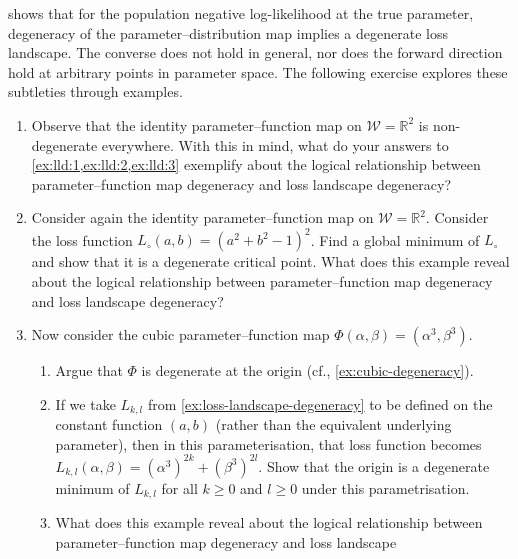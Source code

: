\documentclass[11pt]{article}
\newcommand{\R}{\mathbb{R}}
\newcommand{\W}{\mathcal{W}}
\begin{document}
 shows that for the population negative log-likelihood at
the true parameter, degeneracy of the parameter--distribution map implies a
degenerate loss landscape. The converse does not hold in general, nor does the
forward direction hold at arbitrary points in parameter space. The following
exercise explores these subtleties through examples.

\begin{exercise}
\label{ex:loss-degeneracy-examples}
\begin{enumerate}
    \item
        Observe that the identity parameter--function map on $\W = \R^2$
        is non-degenerate everywhere. With this in mind, what do your answers
        to \cref{ex:lld:1,ex:lld:2,ex:lld:3} exemplify about the logical
        relationship between parameter--function map degeneracy and loss
        landscape degeneracy?
    \item
        Consider again the identity parameter--function map on $\W = \R^2$.
        Consider the loss function $L_\circ(a,b) = (a^2 + b^2 - 1)^2$.
        Find a global minimum of $L_\circ$ and show that it is a degenerate
        critical point.
        What does this example reveal about the logical relationship between
        parameter--function map degeneracy and loss landscape degeneracy?
    \item
        Now consider the cubic parameter--function map
            $\Phi(\alpha, \beta) = (\alpha^3, \beta^3)$.
        \begin{enumerate}
            \item
                Argue that $\Phi$ is degenerate at the origin (cf.,
                \cref{ex:cubic-degeneracy}).
            \item
                If we take $L_{k,l}$ from \cref{ex:loss-landscape-degeneracy} to be
                defined on the constant function $(a, b)$ (rather than the equivalent
                underlying parameter), then in this parameterisation, that loss
                function becomes
                    $L_{k,l}(\alpha,\beta) = (\alpha^3)^{2k} + (\beta^3)^{2l}$.
                Show that the origin is a degenerate minimum of $L_{k,l}$ for all
                $k \geq 0$ and $l \geq 0$ under this parametrisation.
            \item
                What does this example reveal about the logical relationship
                between parameter--function map degeneracy and loss landscape

\end{enumerate}
\end{enumerate}
\end{exercise}
\end{document}
